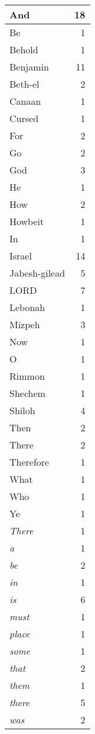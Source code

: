\begin{center}
\begin{longtable}{l|r}
\hline \hline
\endlastfoot
And & 18 \\ \hline
Be & 1 \\ \hline
Behold & 1 \\ \hline
Benjamin & 11 \\ \hline
Beth-el & 2 \\ \hline
Canaan & 1 \\ \hline
Cursed & 1 \\ \hline
For & 2 \\ \hline
Go & 2 \\ \hline
God & 3 \\ \hline
He & 1 \\ \hline
How & 2 \\ \hline
Howbeit & 1 \\ \hline
In & 1 \\ \hline
Israel & 14 \\ \hline
Jabesh-gilead & 5 \\ \hline
LORD & 7 \\ \hline
Lebonah & 1 \\ \hline
Mizpeh & 3 \\ \hline
Now & 1 \\ \hline
O & 1 \\ \hline
Rimmon & 1 \\ \hline
Shechem & 1 \\ \hline
Shiloh & 4 \\ \hline
Then & 2 \\ \hline
There & 2 \\ \hline
Therefore & 1 \\ \hline
What & 1 \\ \hline
Who & 1 \\ \hline
Ye & 1 \\ \hline
\emph{There} & 1 \\ \hline
\emph{a} & 1 \\ \hline
\emph{be} & 2 \\ \hline
\emph{in} & 1 \\ \hline
\emph{is} & 6 \\ \hline
\emph{must} & 1 \\ \hline
\emph{place} & 1 \\ \hline
\emph{some} & 1 \\ \hline
\emph{that} & 2 \\ \hline
\emph{them} & 1 \\ \hline
\emph{there} & 5 \\ \hline
\emph{was} & 2 \\ \hline

\end{longtable}
\end{center}
